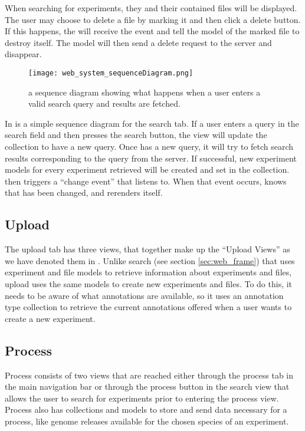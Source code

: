 \begin{example}
When searching for experiments, they and their contained files will be displayed. The user may choose to delete a file by marking it and then click a delete button. If this happens, the  will receive the event and tell the model of the marked file to destroy itself. The model will then send a delete request to the server and disappear.
\end{example}

 
\begin{figure}[h]
\centering
\texttt{[image: web\_system\_sequenceDiagram.png]}
\caption{\label{fig:web_system_sequenceDiagram}a sequence diagram showing what happens when a user enters a valid search query and results are fetched.}
\end{figure}

In  is a simple sequence diagram for the search tab. If a user enters a query in the search field and then presses the search button, the  view will update the  collection to have a new query. Once  has a new query, it will try to fetch search results corresponding to the query from the server. If successful, new experiment models for every experiment retrieved will be created and set in the  collection.  then triggers a “change event” that  listens to. When that event occurs,  knows that  has been changed, and rerenders itself.

\subsection{Upload}
The upload tab has three views, that together make up the “Upload Views” as we have denoted them in . Unlike search (see section \ref{sec:web_frame}) that uses experiment and file models to retrieve information about experiments and files, upload uses the same models to create new experiments and files. To do this, it needs to be aware of what annotations are available, so it uses an annotation type collection to retrieve the current annotations offered when a user wants to create a new experiment.

\subsection{Process} 
Process consists of two views that are reached either through the process
tab in the main navigation bar or through the process button in the search view
that allows the user to search for experiments prior to entering the process
view. Process also has collections and models to store and send data necessary 
for a process, like genome releases available for the chosen species of an 
experiment.

